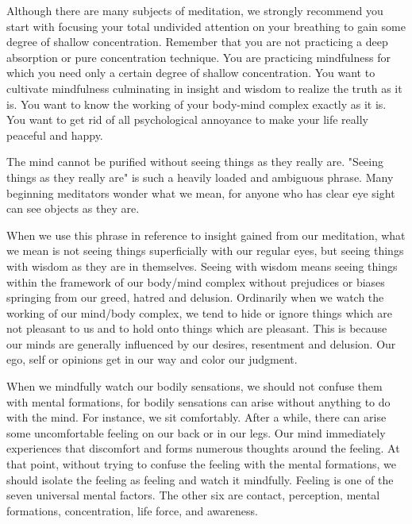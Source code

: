 Although there are many subjects of meditation, we
strongly recommend you start with focusing your total undivided attention on
your breathing to gain some degree of shallow concentration. Remember that you
are not practicing a deep absorption or pure concentration technique. You are
practicing mindfulness for which you need only a certain degree of shallow
concentration. You want to cultivate mindfulness culminating in insight and
wisdom to realize the truth as it is. You want to know the working of your
body-mind complex exactly as it is. You want to get rid of all psychological
annoyance to make your life really peaceful and happy.

The mind cannot be purified without seeing things as they really are. "Seeing
things as they really are" is such a heavily loaded and ambiguous phrase. Many
beginning meditators wonder what we mean, for anyone who has clear eye sight can
see objects as they are.

When we use this phrase in reference to insight gained from our meditation, what
we mean is not seeing things superficially with our regular eyes, but seeing
things with wisdom as they are in themselves. Seeing with wisdom means seeing
things within the framework of our body/mind complex without prejudices or
biases springing from our greed, hatred and delusion. Ordinarily when we watch
the working of our mind/body complex, we tend to hide or ignore things which are
not pleasant to us and to hold onto things which are pleasant. This is because
our minds are generally influenced by our desires, resentment and delusion. Our
ego, self or opinions get in our way and color our judgment.

When we mindfully watch our bodily sensations, we should not confuse them with
mental formations, for bodily sensations can arise without anything to do with
the mind. For instance, we sit comfortably. After a while, there can arise some
uncomfortable feeling on our back or in our legs. Our mind immediately
experiences that discomfort and forms numerous thoughts around the feeling. At
that point, without trying to confuse the feeling with the mental formations, we
should isolate the feeling as feeling and watch it mindfully. Feeling is one of
the seven universal mental factors. The other six are contact, perception,
mental formations, concentration, life force, and awareness.

